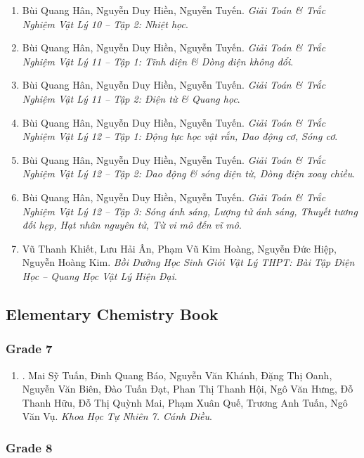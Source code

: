 \documentclass{article}
\begin{document}
\begin{enumerate}
	\item Bùi Quang Hân, Nguyễn Duy Hiền, Nguyễn Tuyến. \textit{Giải Toán \& Trắc Nghiệm Vật Lý 10 -- Tập 2: Nhiệt học}.
	\item Bùi Quang Hân, Nguyễn Duy Hiền, Nguyễn Tuyến. \textit{Giải Toán \& Trắc Nghiệm Vật Lý 11 -- Tập 1: Tĩnh điện \& Dòng điện không đổi}.
	\item Bùi Quang Hân, Nguyễn Duy Hiền, Nguyễn Tuyến. \textit{Giải Toán \& Trắc Nghiệm Vật Lý 11 -- Tập 2: Điện từ \& Quang học}.
	\item Bùi Quang Hân, Nguyễn Duy Hiền, Nguyễn Tuyến. \textit{Giải Toán \& Trắc Nghiệm Vật Lý 12 -- Tập 1: Động lực học vật rắn, Dao động cơ, Sóng cơ}.
	\item Bùi Quang Hân, Nguyễn Duy Hiền, Nguyễn Tuyến. \textit{Giải Toán \& Trắc Nghiệm Vật Lý 12 -- Tập 2: Dao động \& sóng điện từ, Dòng điện xoay chiều}.
	\item Bùi Quang Hân, Nguyễn Duy Hiền, Nguyễn Tuyến. \textit{Giải Toán \& Trắc Nghiệm Vật Lý 12 -- Tập 3: Sóng ánh sáng, Lượng tử ánh sáng, Thuyết tương đối hẹp, Hạt nhân nguyên tử, Từ vi mô đến vĩ mô}.
	\item Vũ Thanh Khiết, Lưu Hải Ân, Phạm Vũ Kim Hoàng, Nguyễn Đức Hiệp, Nguyễn Hoàng Kim. \textit{Bồi Dưỡng Học Sinh Giỏi Vật Lý THPT: Bài Tập Điện Học -- Quang Học Vật Lý Hiện Đại}.
\end{enumerate}

\subsection{Elementary Chemistry Book}

\subsubsection{Grade 7}

\begin{enumerate}
	\item \cite{SGK_KHTN_7_Canh_Dieu}. Mai Sỹ Tuấn, Đinh Quang Báo, Nguyễn Văn Khánh, Đặng Thị Oanh, Nguyễn Văn Biên, Đào Tuấn Đạt, Phan Thị Thanh Hội, Ngô Văn Hưng, Đỗ Thanh Hữu, Đỗ Thị Quỳnh Mai, Phạm Xuân Quế, Trương Anh Tuấn, Ngô Văn Vụ. \textit{Khoa Học Tự Nhiên 7. Cánh Diều}.\hfill{\sf[downloaded]}
\end{enumerate}

\subsubsection{Grade 8}
\end{document}
